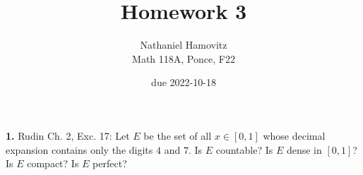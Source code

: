 \documentclass{article}
\begin{document}


\title{Homework 3} %
\author{Nathaniel Hamovitz\\Math 118A, Ponce, F22}
\date{due 2022-10-18}

\maketitle

\textbf{1. }
Rudin Ch. 2, Exc. 17: Let $E$ be the set of all $x \in [0, 1]$ whose decimal expansion contains only the digits $4$ and $7$. Is $E$ countable? Is $E$ dense in $[0, 1]$? Is $E$ compact? Is $E$ perfect?
\end{document}
